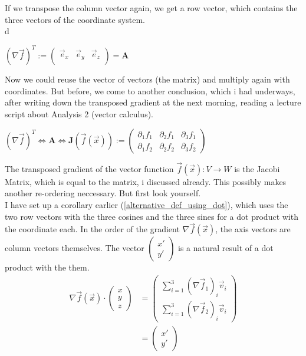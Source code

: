 \documentclass[a4paper]{article}
\begin{document}
If we transpose the column vector again, we get a row vector, which contains the three vectors of the coordinate system.\\d

\begin{center}
$(\nabla\vec{f})^{T} := \begin{pmatrix}\vec{e}_{x} & \vec{e}_{y} &\vec{e}_{z}\\\end{pmatrix} = \boldsymbol{A} $
\end{center}

Now we could reuse the vector of vectors (the matrix) and multiply again with coordinates. But before, we come to another conclusion, which i had underways, after writing down the transposed gradient at the next morning, reading a lecture script about Analysis 2 (vector calculus).\\

\begin{center}
$(\nabla\vec{f})^{T} \Leftrightarrow  \boldsymbol{A}  \Leftrightarrow \boldsymbol{J}(\vec{f}(\vec{x})) := \begin{pmatrix}\partial_{1}f_{1} & \partial_{2}f_{1} & \partial_{3}f_{1}\\\partial_{1}f_{2} & \partial_{2}f_{2} & \partial_{3}f_{2}\end{pmatrix}$
\end{center}

The transposed gradient of the vector function $\vec{f}(\vec{x}) : V \rightarrow W$ is the Jacobi Matrix, which is equal to the matrix, i discussed already. This possibly makes another re-ordering neccessary. But first look yourself.\\

I have set up a corollary earlier (\ref{alternative_def_using_dot}), which uses the two row vectors with the three cosines and the three sines for a dot product with the coordinate each. In the order of the gradient $\nabla\vec{f}(\vec{x})$, the axis vectors are column vectors themselves. The vector $\begin{pmatrix}x'\\y'\end{pmatrix}$ is a natural result of a dot product with the them.\\

\begin{displaymath}
\begin{align}
\nabla\vec{f}(\vec{x}) \cdot \begin{pmatrix}x\\y\\z\end{pmatrix} &= \begin{pmatrix}\sum_{i=1}^{3}(\nabla\vec{f}_{1})_{i}\vec{v}_{i}\\\sum_{i=1}^{3}(\nabla\vec{f}_{2})_{i}\vec{v}_{i}\end{pmatrix}\\ &= \begin{pmatrix}x'\\y'\end{pmatrix}
\end{align}
\end{displaymath}
\end{document}
